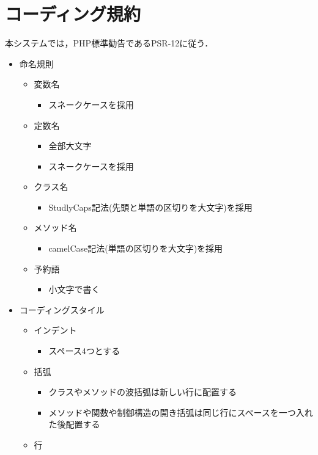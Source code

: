 \documentclass[a4paper, titlepage]{jsarticle}
\begin{document}
\section{コーディング規約}
本システムでは，PHP標準勧告であるPSR-12\cite{PSR}に従う．
\begin{itemize}
  \item 命名規則
  \begin{itemize}
    \item 変数名
    \begin{itemize}
      \item スネークケースを採用
    \end{itemize}
    \item 定数名
    \begin{itemize}
      \item 全部大文字
      \item スネークケースを採用
    \end{itemize}
    \item クラス名
    \begin{itemize}
      \item StudlyCaps記法(先頭と単語の区切りを大文字)を採用
    \end{itemize}
    \item メソッド名
    \begin{itemize}
      \item camelCase記法(単語の区切りを大文字)を採用
    \end{itemize}
    \item 予約語
    \begin{itemize}
      \item 小文字で書く
    \end{itemize}
  \end{itemize}
  \item コーディングスタイル
  \begin{itemize}
    \item インデント
    \begin{itemize}
      \item スペース4つとする
    \end{itemize}
    \item 括弧
    \begin{itemize}
      \item クラスやメソッドの波括弧は新しい行に配置する
      \item メソッドや関数や制御構造の開き括弧は同じ行にスペースを一つ入れた後配置する
    \end{itemize}
    \item 行

\end{itemize}
\end{itemize}
\end{document}
